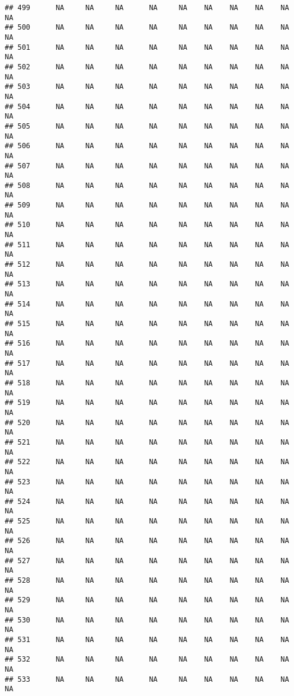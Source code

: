 \documentclass{article}\usepackage{graphicx, color}
\makeatletter
\newenvironment{kframe}{%
 \def\at@end@of@kframe{}%
 \ifinner\ifhmode%
  \def\at@end@of@kframe{\end{minipage}}%
  \begin{minipage}{\columnwidth}%
 \fi\fi%
 \def\FrameCommand##1{\hskip\@totalleftmargin \hskip-\fboxsep
 \colorbox{shadecolor}{##1}\hskip-\fboxsep
     \hskip-\linewidth \hskip-\@totalleftmargin \hskip\columnwidth}%
 \MakeFramed {\advance\hsize-\width
   \@totalleftmargin\z@ \linewidth\hsize
   \@setminipage}}%
 {\par\unskip\endMakeFramed%
 \at@end@of@kframe}
\newenvironment{knitrout}{}{} %
\makeatother
\begin{document}
\begin{knitrout}
\begin{kframe}
\begin{verbatim}
## 499      NA     NA     NA      NA     NA    NA    NA    NA    NA     NA
## 500      NA     NA     NA      NA     NA    NA    NA    NA    NA     NA
## 501      NA     NA     NA      NA     NA    NA    NA    NA    NA     NA
## 502      NA     NA     NA      NA     NA    NA    NA    NA    NA     NA
## 503      NA     NA     NA      NA     NA    NA    NA    NA    NA     NA
## 504      NA     NA     NA      NA     NA    NA    NA    NA    NA     NA
## 505      NA     NA     NA      NA     NA    NA    NA    NA    NA     NA
## 506      NA     NA     NA      NA     NA    NA    NA    NA    NA     NA
## 507      NA     NA     NA      NA     NA    NA    NA    NA    NA     NA
## 508      NA     NA     NA      NA     NA    NA    NA    NA    NA     NA
## 509      NA     NA     NA      NA     NA    NA    NA    NA    NA     NA
## 510      NA     NA     NA      NA     NA    NA    NA    NA    NA     NA
## 511      NA     NA     NA      NA     NA    NA    NA    NA    NA     NA
## 512      NA     NA     NA      NA     NA    NA    NA    NA    NA     NA
## 513      NA     NA     NA      NA     NA    NA    NA    NA    NA     NA
## 514      NA     NA     NA      NA     NA    NA    NA    NA    NA     NA
## 515      NA     NA     NA      NA     NA    NA    NA    NA    NA     NA
## 516      NA     NA     NA      NA     NA    NA    NA    NA    NA     NA
## 517      NA     NA     NA      NA     NA    NA    NA    NA    NA     NA
## 518      NA     NA     NA      NA     NA    NA    NA    NA    NA     NA
## 519      NA     NA     NA      NA     NA    NA    NA    NA    NA     NA
## 520      NA     NA     NA      NA     NA    NA    NA    NA    NA     NA
## 521      NA     NA     NA      NA     NA    NA    NA    NA    NA     NA
## 522      NA     NA     NA      NA     NA    NA    NA    NA    NA     NA
## 523      NA     NA     NA      NA     NA    NA    NA    NA    NA     NA
## 524      NA     NA     NA      NA     NA    NA    NA    NA    NA     NA
## 525      NA     NA     NA      NA     NA    NA    NA    NA    NA     NA
## 526      NA     NA     NA      NA     NA    NA    NA    NA    NA     NA
## 527      NA     NA     NA      NA     NA    NA    NA    NA    NA     NA
## 528      NA     NA     NA      NA     NA    NA    NA    NA    NA     NA
## 529      NA     NA     NA      NA     NA    NA    NA    NA    NA     NA
## 530      NA     NA     NA      NA     NA    NA    NA    NA    NA     NA
## 531      NA     NA     NA      NA     NA    NA    NA    NA    NA     NA
## 532      NA     NA     NA      NA     NA    NA    NA    NA    NA     NA
## 533      NA     NA     NA      NA     NA    NA    NA    NA    NA     NA

\end{verbatim}
\end{kframe}
\end{knitrout}
\end{document}
